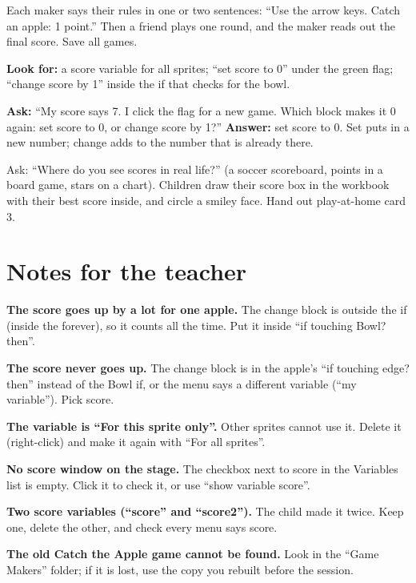 \begin{teacherscript}
Each maker says their rules in one or two sentences: \enquote{Use the arrow keys. Catch an apple: 1 point.} Then a friend plays one round, and the maker reads out the final score. Save all games.
\end{teacherscript}

\begin{formativecheck}
\textbf{Look for:} a score variable for all sprites; \enquote{set score to 0} under the green flag; \enquote{change score by 1} inside the if that checks for the bowl.

\textbf{Ask:} \enquote{My score says 7. I click the flag for a new game. Which block makes it 0 again: set score to 0, or change score by 1?}
\textbf{Answer:} set score to 0. Set puts in a new number; change adds to the number that is already there.
\end{formativecheck}

\begin{reflection}
Ask: \enquote{Where do you see scores in real life?} (a soccer scoreboard, points in a board game, stars on a chart). Children draw their score box in the workbook with their best score inside, and circle a smiley face. Hand out play-at-home card 3.
\end{reflection}

\section{Notes for the teacher}
\begin{commonmistakes}
  \item \textbf{The score goes up by a lot for one apple.} The change block is outside the if (inside the forever), so it counts all the time. Put it inside \enquote{if touching Bowl? then}.
  \item \textbf{The score never goes up.} The change block is in the apple's \enquote{if touching edge? then} instead of the Bowl if, or the menu says a different variable (\enquote{my variable}). Pick score.
  \item \textbf{The variable is \enquote{For this sprite only}.} Other sprites cannot use it. Delete it (right-click) and make it again with \enquote{For all sprites}.
  \item \textbf{No score window on the stage.} The checkbox next to score in the Variables list is empty. Click it to check it, or use \enquote{show variable score}.
  \item \textbf{Two score variables (\enquote{score} and \enquote{score2}).} The child made it twice. Keep one, delete the other, and check every menu says score.
  \item \textbf{The old Catch the Apple game cannot be found.} Look in the \enquote{Game Makers} folder; if it is lost, use the copy you rebuilt before the session.
\end{commonmistakes}


